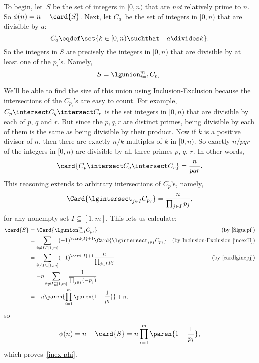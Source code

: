 To begin, let~$S$ be the set of integers in $[0,n)$ that are
  \emph{not} relatively prime to $n$.  So $\phi(n) = n - \card{S}$.
Next, let $C_a$~be the set of integers in $[0,n)$ that are divisible
  by $a$:
\[
C_a \eqdef \set{k \in [0,n) \suchthat\quad a \divides k}.
\]
So the integers in $S$ are precisely the integers in
$[0,n)$ that are divisible by at least one of the $p_i$'s.  Namely,
\begin{equation}\label{Slgucpi}
S = \lgunion_{i=1}^m C_{p_i}.
\end{equation}

We'll be able to find the size of this union using Inclusion-Exclusion
because the intersections of the $C_{p_i}$'s are easy to count.  For
example, $C_p \intersect C_q \intersect C_r$ is the set integers in
$[0,n)$ that are divisible by each of $p$, $q$ and $r$.  But since the
  $p,q,r$ are distinct primes, being divisible by each of them is the
  same as being divisible by their product.  Now if $k$ is a positive
  divisor of $n$, then there are exactly $n/k$ multiples of $k$ in
  $[0,n)$.  So exactly $n/pqr$ of the integers in $[0,n)$ are
      divisible by all three primes $p$, $q$, $r$.  In other words,
\[
\card{C_p \intersect C_q \intersect C_r} = \frac{n}{pqr}.
\]
This reasoning extends to arbitrary intersections of $C_p$'s, namely,
\begin{equation}\label{cardlgincpj}
  \Card{\lgintersect_{j \in I} C_{p_j}} = \frac{n}{\prod_{j \in I} {p_j}},
\end{equation}
for any nonempty set $I \subseteq [1,m]$.  This lets us calculate:
\begin{align*}
\card{S}
  & = \Card{\lgunion_{i=1}^m C_{p_i}}
      & \text{(by~\eqref{Slgucpi})}\\
  & = \sum_{\emptyset \neq I \subseteq [1,m]} (-1)^{\card{I}+1} \Card{\lgintersect_{i \in I} C_{p_i}}
      &  \text{(by Inclusion-Exclusion~\eqref{incexII})}\\
  & =  \sum_{\emptyset \neq I \subseteq [1,m]} (-1)^{\card{I}+1} \frac{n}{\prod_{j \in I} {p_j}}
      & \text{(by~\eqref{cardlgincpj})}\\
  & = -n\sum_{\emptyset \neq I \subseteq [1,m]} \frac{1}{\prod_{j \in I} (-p_j)}\\
  & = - n \paren{\prod_{i=1}^m \paren{1-\frac{1}{p_i}}} + n,
\end{align*}
so
\[
\phi(n) = n - \card{S} = n \prod_{i=1}^m \paren{1-\frac{1}{p_i}},
\]
which proves~\eqref{inex-phi}.

